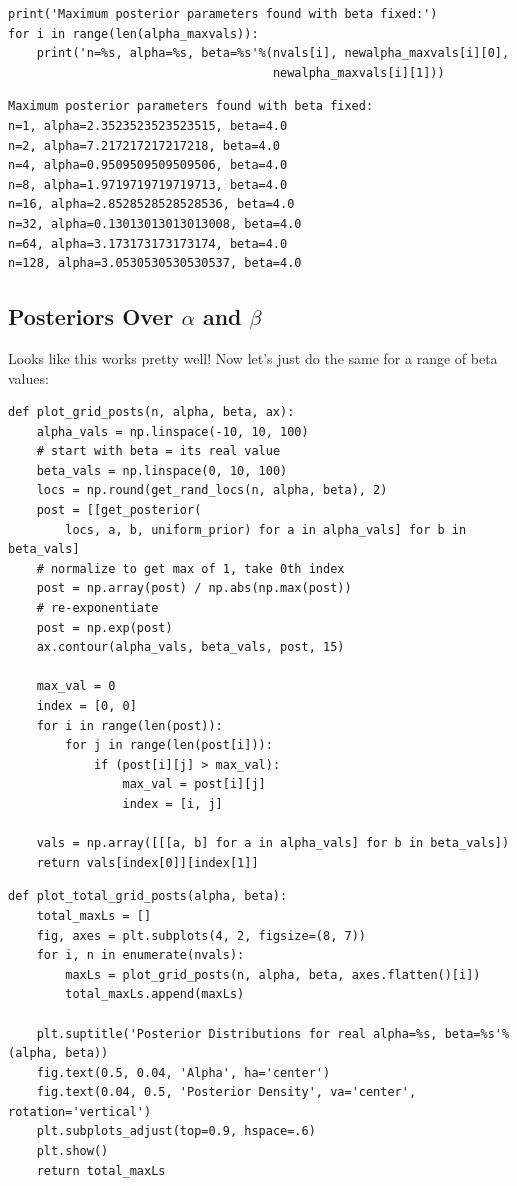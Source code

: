 \documentclass[11pt]{article}
\begin{document}
\begin{verbatim}
print('Maximum posterior parameters found with beta fixed:')
for i in range(len(alpha_maxvals)):
    print('n=%s, alpha=%s, beta=%s'%(nvals[i], newalpha_maxvals[i][0], 
                                     newalpha_maxvals[i][1]))
\end{verbatim}

\begin{verbatim}
Maximum posterior parameters found with beta fixed:
n=1, alpha=2.3523523523523515, beta=4.0
n=2, alpha=7.217217217217218, beta=4.0
n=4, alpha=0.9509509509509506, beta=4.0
n=8, alpha=1.9719719719719713, beta=4.0
n=16, alpha=2.8528528528528536, beta=4.0
n=32, alpha=0.13013013013013008, beta=4.0
n=64, alpha=3.173173173173174, beta=4.0
n=128, alpha=3.0530530530530537, beta=4.0
\end{verbatim}

\subsection*{Posteriors Over $\alpha$ and $\beta$}
\label{sec-2-5}

Looks like this works pretty well! Now let's just do the same for a range of
beta values:

\begin{verbatim}
def plot_grid_posts(n, alpha, beta, ax):
    alpha_vals = np.linspace(-10, 10, 100)
    # start with beta = its real value
    beta_vals = np.linspace(0, 10, 100)
    locs = np.round(get_rand_locs(n, alpha, beta), 2)
    post = [[get_posterior(
        locs, a, b, uniform_prior) for a in alpha_vals] for b in beta_vals]
    # normalize to get max of 1, take 0th index
    post = np.array(post) / np.abs(np.max(post))
    # re-exponentiate
    post = np.exp(post)
    ax.contour(alpha_vals, beta_vals, post, 15)

    max_val = 0
    index = [0, 0]
    for i in range(len(post)):
        for j in range(len(post[i])):
            if (post[i][j] > max_val):
                max_val = post[i][j]
                index = [i, j]

    vals = np.array([[[a, b] for a in alpha_vals] for b in beta_vals])
    return vals[index[0]][index[1]]
\end{verbatim}


\begin{verbatim}
def plot_total_grid_posts(alpha, beta):
    total_maxLs = []
    fig, axes = plt.subplots(4, 2, figsize=(8, 7))
    for i, n in enumerate(nvals):
        maxLs = plot_grid_posts(n, alpha, beta, axes.flatten()[i])
        total_maxLs.append(maxLs)

    plt.suptitle('Posterior Distributions for real alpha=%s, beta=%s'%(alpha, beta))
    fig.text(0.5, 0.04, 'Alpha', ha='center')
    fig.text(0.04, 0.5, 'Posterior Density', va='center', rotation='vertical')
    plt.subplots_adjust(top=0.9, hspace=.6)
    plt.show()
    return total_maxLs
\end{verbatim}
\end{document}
